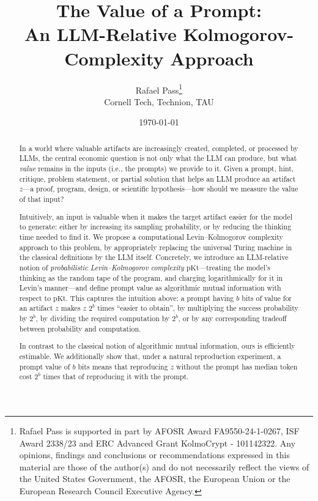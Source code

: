 \documentclass[letterpaper]{article} %
\title{The Value of a Prompt:\\
An LLM-Relative Kolmogorov-Complexity Approach}
\author{Rafael Pass\footnote{Rafael Pass is supported in part by AFOSR Award FA9550-24-1-0267, ISF Award 2338/23 and ERC Advanced Grant KolmoCrypt - 101142322. Any opinions, findings and conclusions or recommendations expressed in this material are those of the author(s) and do not necessarily reflect the views of the United States Government, the AFOSR, the European Union or the European Research Council Executive Agency.
}\\Cornell Tech, Technion, TAU}
\date{\today}
\theoremstyle{definition}
\theoremstyle{remark}
\newcommand{\pKt}{\mathrm{pKt}}
\begin{document}
\maketitle

\begin{abstract}
In a world where valuable artifacts are increasingly created, completed, or
processed by LLMs, the central economic question is not only what the LLM can
produce, but what \emph{value} remains in the inputs (i.e., the prompts) we
provide to it. Given a prompt, hint, critique, problem statement, or partial
solution that helps an LLM produce an artifact $z$---a proof, program, design,
or scientific hypothesis---how should we measure the value of that input?

Intuitively, an input is valuable when it makes the target artifact easier for
the model to generate: either by increasing its sampling probability, or by
reducing the thinking time needed to find it. We propose a computational
Levin--Kolmogorov complexity approach to this problem, by appropriately
replacing the universal Turing machine in the classical definitions by the LLM
itself. Concretely, we introduce an LLM-relative notion of \emph{probabilistic
Levin--Kolmogorov complexity} $\pKt$---treating the model's thinking as the
random tape of the program, and charging logarithmically for it in Levin's
manner---and define prompt value as algorithmic mutual information with respect
to $\pKt$. This captures the intuition above: a prompt having $b$ bits of value
for an artifact $z$ makes $z$ $2^b$ times ``easier to obtain'', by
multiplying the success probability by $2^b$, by dividing the required
computation by $2^b$, or by any corresponding tradeoff between probability and
computation.

In contrast to the classical notion of algorithmic mutual information, ours is efficiently estimable.
We additionally show that, under a natural reproduction experiment, a prompt
value of \(b\) bits means that reproducing \(z\) without the prompt has median
token cost \(2^b\) times that of reproducing it with the prompt.
\end{abstract}

\newpage
\end{document}
